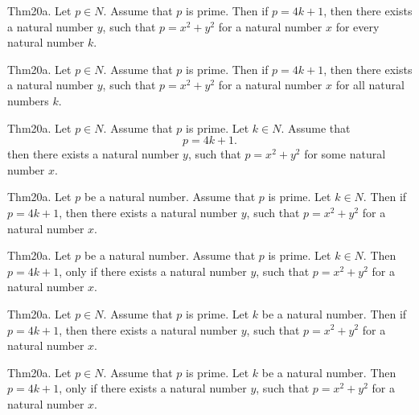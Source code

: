 \documentclass{article}
\begin{document}
Thm20a. Let $p \in N$. Assume that $p$ is prime. Then if $p = 4 k + 1$, then there exists a natural number $y$, such that $p = x ^{ 2}+ y ^{ 2}$ for a natural number $x$ for every natural number $k$.

Thm20a. Let $p \in N$. Assume that $p$ is prime. Then if $p = 4 k + 1$, then there exists a natural number $y$, such that $p = x ^{ 2}+ y ^{ 2}$ for a natural number $x$ for all natural numbers $k$.

Thm20a. Let $p \in N$. Assume that $p$ is prime. Let $k \in N$. Assume that $$p = 4 k + 1.$$ then there exists a natural number $y$, such that $p = x ^{ 2}+ y ^{ 2}$ for some natural number $x$.

Thm20a. Let $p$ be a natural number. Assume that $p$ is prime. Let $k \in N$. Then if $p = 4 k + 1$, then there exists a natural number $y$, such that $p = x ^{ 2}+ y ^{ 2}$ for a natural number $x$.

Thm20a. Let $p$ be a natural number. Assume that $p$ is prime. Let $k \in N$. Then $p = 4 k + 1$, only if there exists a natural number $y$, such that $p = x ^{ 2}+ y ^{ 2}$ for a natural number $x$.

Thm20a. Let $p \in N$. Assume that $p$ is prime. Let $k$ be a natural number. Then if $p = 4 k + 1$, then there exists a natural number $y$, such that $p = x ^{ 2}+ y ^{ 2}$ for a natural number $x$.

Thm20a. Let $p \in N$. Assume that $p$ is prime. Let $k$ be a natural number. Then $p = 4 k + 1$, only if there exists a natural number $y$, such that $p = x ^{ 2}+ y ^{ 2}$ for a natural number $x$.
\end{document}
